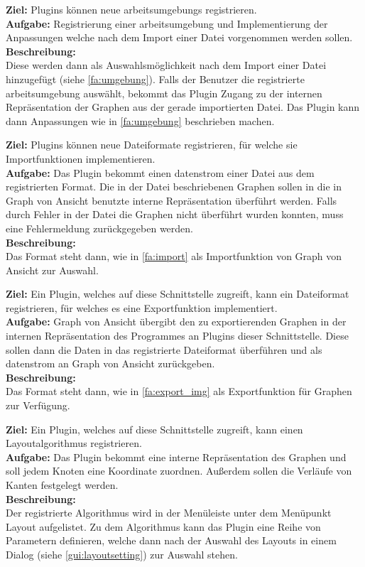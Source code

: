 \label{s:umgebung}
\textbf{Ziel:} Plugins können neue \glspl{arbeitsumgebung} registrieren.\\
\textbf{Aufgabe:}
Registrierung einer \gls{arbeitsumgebung} und Implementierung der Anpassungen welche nach dem Import einer Datei vorgenommen werden sollen.\\
\textbf{Beschreibung:}\\
Diese werden dann als Auswahlsmöglichkeit nach dem Import einer Datei hinzugefügt (siehe \ref{fa:umgebung}).
Falls der Benutzer die registrierte \gls{arbeitsumgebung} auswählt, bekommt das Plugin Zugang zu der internen Repräsentation der Graphen aus der gerade importierten Datei. Das Plugin kann dann Anpassungen wie in \ref{fa:umgebung} beschrieben machen.

\label{s:import}
\textbf{Ziel:} Plugins können neue Dateiformate registrieren, für welche sie Importfunktionen implementieren.\\
\textbf{Aufgabe:}
Das Plugin bekommt einen \gls{datenstrom} einer Datei aus dem registrierten Format. Die in der Datei beschriebenen Graphen sollen in die in Graph von Ansicht benutzte interne Repräsentation überführt werden. Falls durch Fehler in der Datei die Graphen nicht überführt wurden konnten, muss eine Fehlermeldung zurückgegeben werden.\\
\textbf{Beschreibung:}\\
Das Format steht dann, wie in \ref{fa:import} als Importfunktion von Graph von Ansicht zur Auswahl.

\label{s:export}
\textbf{Ziel:} Ein Plugin, welches auf diese Schnittstelle zugreift, kann ein Dateiformat registrieren, für welches es eine Exportfunktion implementiert.\\
\textbf{Aufgabe:}
Graph von Ansicht übergibt den zu exportierenden Graphen in der internen Repräsentation des Programmes an Plugins dieser Schnittstelle. Diese sollen dann die Daten in das registrierte Dateiformat überführen und als \gls{datenstrom} an Graph von Ansicht zurückgeben.\\
\textbf{Beschreibung:}\\
Das Format steht dann, wie in \ref{fa:export_img} als Exportfunktion für Graphen zur Verfügung.

\label{layoutalgo}
\textbf{Ziel:} Ein Plugin, welches auf diese Schnittstelle zugreift, kann einen Layoutalgorithmus registrieren.\\
\textbf{Aufgabe:}
Das Plugin bekommt eine interne Repräsentation des Graphen und soll jedem Knoten eine Koordinate zuordnen. Außerdem sollen die Verläufe von Kanten festgelegt werden.\\
\textbf{Beschreibung:}\\
Der registrierte Algorithmus wird in der Menüleiste unter dem Menüpunkt Layout aufgelistet.
Zu dem Algorithmus kann das Plugin eine Reihe von Parametern definieren, welche dann nach der Auswahl des Layouts in einem Dialog (siehe \ref{gui:layoutsetting}) zur Auswahl stehen.


